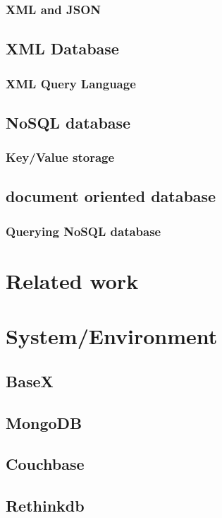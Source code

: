 \documentclass[a4paper,12pt]{article}
\begin{document}
		\subsubsection{XML and JSON}
		\subsection{XML Database}
			\subsubsection{XML Query Language}
		\subsection{NoSQL database}
			\subsubsection{Key/Value storage}
			\subsection{document oriented database}
		\subsubsection{Querying NoSQL database}
		
	\newpage
	\section{Related work}
	\newpage
	\section{System/Environment}
		\subsection{BaseX}
			
			
			\newpage
		\subsection{MongoDB}
		\subsection{Couchbase}
		\subsection{Rethinkdb}		
\end{document}
